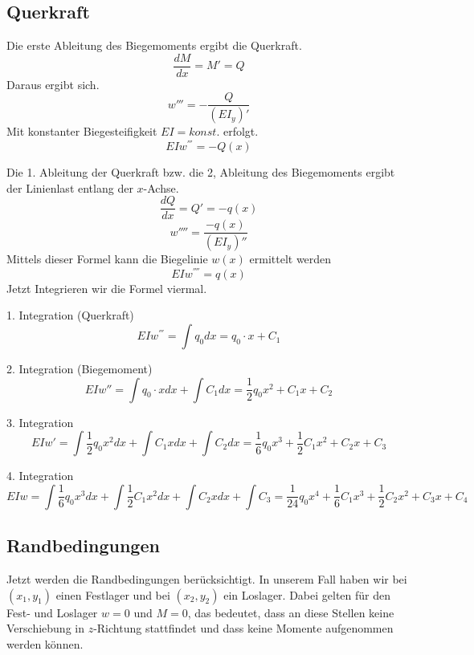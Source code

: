 \subsection{Querkraft}
Die erste Ableitung des Biegemoments ergibt die Querkraft.
\begin{equation}
	\frac{dM}{dx}=
	M'=
	Q
\end{equation}
Daraus ergibt sich.
\begin{equation}
	w'''=
	-\frac{Q}{(EI_y)'}
\end{equation}
Mit konstanter Biegesteifigkeit $EI = konst.$ erfolgt.
\begin{equation}
	EIw^{'''}=
	-Q\left(x\right)
\end{equation}

Die 1. Ableitung der Querkraft bzw. die 2, Ableitung des Biegemoments ergibt der Linienlast entlang der $x$-Achse.
\begin{equation}
	\frac{dQ}{dx}=
	Q'=
	-q(x)
\end{equation}
\begin{equation}
	w''''=
	\frac{-q(x)}{(EI_y)''}
\end{equation}
Mittels dieser Formel kann die Biegelinie $w(x)$ ermittelt werden
\begin{equation}
	EIw^{''''}=
	q\left(x\right) 
\end{equation}
Jetzt Integrieren wir die Formel viermal.

1. Integration (Querkraft)
\begin{equation}
	EIw^{'''}=
	\int q_0dx=
	q_0\cdot x+C_1
\end{equation}

2. Integration (Biegemoment)
\begin{equation}
	EIw''=
	\int{q_0\cdot x}dx+\int C_1dx=
	\frac{1}{2}q_0x^2+C_1x+C_2
\end{equation}

3. Integration
\begin{equation}
	EIw'=
	\int{\frac{1}{2}q_0x^2}dx+\int{C_1x}dx+\int C_2dx=
	\frac{1}{6}q_0x^3+\frac{1}{2}C_1x^2+C_2x+C_3
\end{equation}

4. Integration
\begin{equation}
	EIw=
	\int{\frac{1}{6}q_0x^3}dx+\int{\frac{1}{2}C_1x^2}dx+\int{C_2x}dx+\int C_3=
	\frac{1}{24}q_0x^4+\frac{1}{6}C_1x^3+\frac{1}{2}C_2x^2+C_3x+C_4
\end{equation}

\subsection{Randbedingungen}
Jetzt werden die Randbedingungen berücksichtigt.
In unserem Fall haben wir bei $(x_1, y_1)$ einen Festlager und bei $(x_2, y_2)$ ein Loslager.
Dabei gelten für den Fest- und Loslager $w = 0$ und $M = 0$, das bedeutet, dass an diese Stellen keine Verschiebung in $z$-Richtung stattfindet und dass keine Momente aufgenommen werden können.

